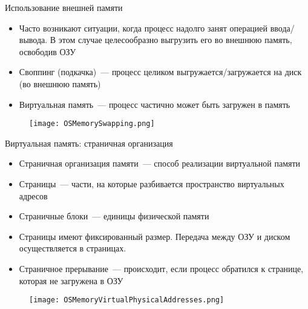 \documentclass[aspectratio=169,14pt]{beamer}
\begin{document}
\begin{frame}{Использование внешней памяти}
    \begin{itemize}
        \item Часто возникают ситуации, когда процесс надолго занят операцией
        ввода/вывода. В этом случае целесообразно выгрузить его во внешнюю
        память, освободив ОЗУ
        \item Своппинг (подкачка)~--- процесс целиком выгружается/загружается
        на диск (во внешнюю память)
        \item Виртуальная память~--- процесс частично может быть загружен в
        память
    \end{itemize}
    \begin{figure}[htp]
        \centering
        \texttt{[image: OSMemorySwapping.png]}
    \end{figure}
\end{frame}

\begin{frame}{Виртуальная память: страничная организация}
    \begin{footnotesize}
    \begin{itemize}
        \item Страничная организация памяти~--- способ реализации виртуальной
        памяти
        \item Страницы~--- части, на которые разбивается пространство
        виртуальных адресов
        \item Страничные блоки~--- единицы физической памяти
        \item Страницы имеют фиксированный размер. Передача между ОЗУ и
        диском осуществляется в страницах.
        \item Страничное прерывание~--- происходит, если процесс обратился к
        странице, которая не загружена в ОЗУ
    \end{itemize}
    \end{footnotesize}
    \begin{figure}[htp]
        \centering
        \texttt{[image: OSMemoryVirtualPhysicalAddresses.png]}
    \end{figure}
\end{frame}
\end{document}
